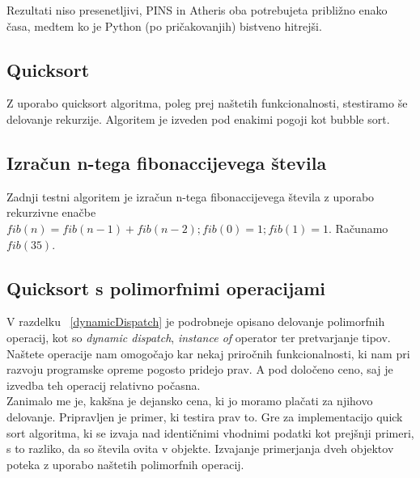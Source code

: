 \documentclass[a4paper, 12p]{book}
\begin{document}
Rezultati niso presenetljivi, PINS in Atheris oba potrebujeta približno enako časa, medtem ko je Python (po pričakovanjih) bistveno hitrejši.

\subsection{Quicksort}

Z uporabo quicksort algoritma, poleg prej naštetih funkcionalnosti, stestiramo še delovanje rekurzije. Algoritem je izveden pod enakimi pogoji kot bubble sort. \\


\subsection{Izračun n-tega fibonaccijevega števila}

Zadnji testni algoritem je izračun n-tega fibonaccijevega števila z uporabo rekurzivne enačbe
$fib(n) = fib(n - 1) + fib(n - 2) ; fib(0) = 1; fib(1) = 1$. Računamo $fib(35)$. \\


\subsection{Quicksort s polimorfnimi operacijami}

V razdelku ~\ref{dynamicDispatch} je podrobneje opisano delovanje polimorfnih operacij, kot so \textit{dynamic dispatch}, \textit{instance of} operator ter pretvarjanje tipov. Naštete operacije nam omogočajo kar nekaj priročnih funkcionalnosti, ki nam pri razvoju programske opreme pogosto pridejo prav. A pod določeno ceno, saj je izvedba teh operacij relativno počasna. \\
\indent Zanimalo me je, kakšna je dejansko cena, ki jo moramo plačati za njihovo delovanje. Pripravljen je primer, ki testira prav to.
Gre za implementacijo quick sort algoritma, ki se izvaja nad identičnimi vhodnimi podatki kot prejšnji primeri, s to razliko, da so števila ovita v objekte. Izvajanje primerjanja dveh objektov poteka z uporabo naštetih polimorfnih operacij. \\
\end{document}
